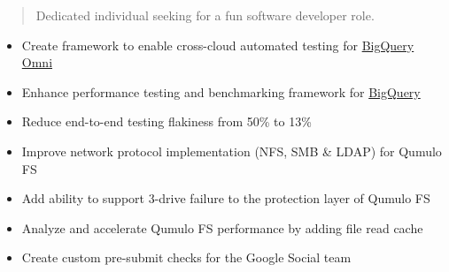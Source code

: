 \documentclass[10pt,a4paper,normalphoto]{altacv}
\begin{document}
\begin{paracol}{2}
        \newpage
        
        \switchcolumn
        
            \begin{quote}
                Dedicated individual seeking for a fun software developer role.
            \end{quote}
        
            \begin{itemize}
                \item Create framework to enable cross-cloud automated testing for \href{https://cloud.google.com/blog/products/data-analytics/introducing-bigquery-omni}{BigQuery Omni}
                \item Enhance performance testing and benchmarking framework for \href{https://cloud.google.com/bigquery}{BigQuery}
                \item Reduce end-to-end testing flakiness from 50\% to 13\%
            \end{itemize}
            \divider
            
            \begin{itemize}
                \item Improve network protocol implementation (NFS, SMB \& LDAP) for Qumulo FS
                \item Add ability to support 3-drive failure to the protection layer of Qumulo FS
                \item Analyze and accelerate Qumulo FS performance by adding file read cache
            \end{itemize}
            \divider
            
            \begin{itemize}
                \item Create custom pre-submit checks for the Google Social team
            \end{itemize}
            \divider
            

\end{paracol}
\end{document}
